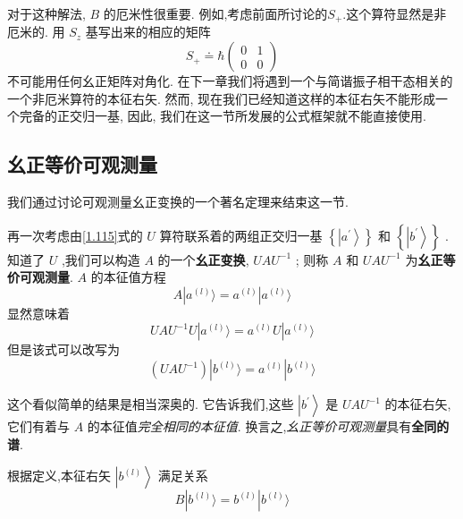 \documentclass[lang=cn,newtx,10pt,scheme=chinese,thmcnt=section]{elegantbook}
\begin{document}
对于这种解法, $B$ 的厄米性很重要. 例如,考虑前面所讨论的${S}_{+}$.这个算符显然是非厄米的. 用 ${S}_{z}$ 基写出来的相应的矩阵
\begin{equation}
	{S}_{ + } \doteq \hbar \left( \begin{array}{ll} 0 & 1 \\ 0 & 0 \end{array}\right)
\end{equation}
不可能用任何幺正矩阵对角化. 在下一章我们将遇到一个与简谐振子相干态相关的一个非厄米算符的本征右矢. 然而, 现在我们已经知道这样的本征右矢不能形成一个完备的正交归一基, 因此, 我们在这一节所发展的公式框架就不能直接使用.
\subsection*{幺正等价可观测量}
我们通过讨论可观测量幺正变换的一个著名定理来结束这一节.
\begin{theorem}\label{thm:1.4} 
	再一次考虑由\ref{1.115}式的 $U$ 算符联系着的两组正交归一基 $\left\{ \left| {a}^{\prime }\right\rangle \right\}$ 和 $\left\{ \left| {b}^{\prime }\right\rangle \right\}$ . 知道了 $U$ ,我们可以构造 $A$ 的一个\textbf{幺正变换}, ${UA}{U}^{-1}$ ; 则称 $A$ 和 ${UA}{U}^{-1}$ 为\textbf{幺正等价可观测量}. $A$ 的本征值方程
	\begin{equation}
		A| {a}^{\left( l\right) }\rangle = {a}^{\left( l\right) }| {a}^{\left( l\right) }\rangle
	\end{equation}
	显然意味着
	\begin{equation}
		{UA}{U}^{-1}U| {a}^{\left( l\right) }\rangle = {a}^{\left( l\right) }U| {a}^{\left( l\right) }\rangle
	\end{equation}
	但是该式可以改写为
	\begin{equation}
		( {{UA}{U}^{-1}}) | {b}^{\left( l\right) }\rangle = {a}^{\left( l\right) }| {b}^{\left( l\right) }\rangle
	\end{equation}
\end{theorem}

这个看似简单的结果是相当深奥的. 它告诉我们,这些 $\left| {b}^{\prime }\right\rangle$ 是 ${UA}{U}^{-1}$ 的本征右矢, 它们有着与 $A$ 的本征值\textit{完全相同的本征值}. 换言之,\textit{幺正等价可观测量}具有\textbf{全同的谱}.
	
根据定义,本征右矢 $\left| {b}^{\left( l\right) }\right\rangle$ 满足关系
\begin{equation}
	B| {b}^{\left( l\right) }\rangle = {b}^{\left( l\right) }| {b}^{\left( l\right) }\rangle
\end{equation}
\end{document}
